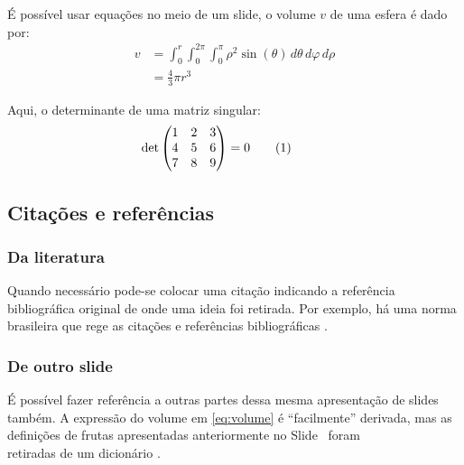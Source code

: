 \documentclass[aspectratio=169]{beamer}
\begin{document}
\newcommand{\pulleqnum}[1][1cm]{\stepcounter{equation}\tag*{(\theequation)\hspace{#1}}}
\begin{frame}[t]\frametitle{\secname}\framesubtitle{\subsecname}
  É possível usar equações no meio de um slide, o volume $v$ de uma esfera é dado por:
  \begin{align}\label{eq:volume}
    v &= \int_0^r \int_0^{2\pi} \int_0^\pi \rho^2 \sin(\theta)\, d\theta\, d\varphi\, d\rho \\[1em]
      &= \frac{4}{3}\pi r^3
  \end{align}

  Aqui, o determinante de uma matriz singular:
  \begin{equation}
    \det \begin{pmatrix}
      1 & 2 & 3 \\
      4 & 5 & 6 \\
      7 & 8 & 9
    \end{pmatrix} = 0\pulleqnum
  \end{equation}
\end{frame}

\subsection{Citações e referências}

\begin{frame}[t]\frametitle{\secname}\framesubtitle{\subsecname}%
  \subsubsection{Da literatura}
  Quando necessário pode-se colocar uma citação indicando a referência bibliográfica original de onde uma ideia foi retirada.
  Por exemplo, há uma norma brasileira que rege as citações e referências bibliográficas \cite{NBR6023:2000}.

  \subsubsection{De outro slide}
  É possível fazer referência a outras partes dessa mesma apresentação de slides também.
  A expressão do volume em \eqref{eq:volume} é ``facilmente'' derivada, mas as definições de frutas apresentadas anteriormente no Slide~ foram\\ retiradas de um dicionário \cite{figueiredo1913novo}.
\end{frame}
\end{document}
